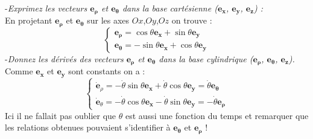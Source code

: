 \documentclass[a4paper,10pt,twoside]{article}
\begin{document}
\noindent -\textit{Exprimez les  vecteurs $\mathbf{ e_\rho}$ et  $\mathbf{ e_\theta}$ dans la base cartésienne ($\mathbf{ e_x}$, $\mathbf{ e_y}$, $\mathbf{ e_z}$) : } \\
En projetant $\mathbf{ e_\rho}$ et $\mathbf{ e_\theta}$ sur les axes $Ox$,$Oy$,$Oz$ on trouve : 
\begin{equation*}
\begin{cases}
     \mathbf{ e_\rho} = \cos{\theta}\mathbf{ e_x} + \sin{\theta}\mathbf{ e_y} \\
     \mathbf{ e_\theta} = -\sin{\theta}\mathbf{ e_x} + \cos{\theta}\mathbf{ e_y}
     \end{cases}
\end{equation*}
\noindent -\textit{Donnez les dérivés des vecteurs $\mathbf{ e_\rho}$ et  $\mathbf{ e_\theta}$ dans la base cylindrique ($\mathbf{ e_\rho}$, $\mathbf{ e_\theta}$, $ \mathbf{e_z}$).} 
\\
Comme $\mathbf{e_x}$ et $\mathbf{e_y}$ sont constants on a :
\begin{equation*}
\begin{cases}
     \mathbf{\dot e}_\rho= -\dot \theta \sin{\theta}\mathbf{ e_x} + \dot \theta \cos{\theta}\mathbf{ e_y} = \dot \theta \mathbf{ e_\theta} \\
     \mathbf{\dot e}_\theta = -\dot \theta\cos{\theta}\mathbf{ e_x}  -\dot\theta\sin{\theta}\mathbf{ e_y} = -\dot\theta\mathbf{ e_\rho}
\end{cases}    
\end{equation*}
Ici il ne fallait pas oublier que $\theta$ est aussi une fonction du temps et remarquer que les relations obtenues pouvaient s'identifier à $\mathbf{ e_\theta}$ et $\mathbf{ e_\rho}$ !\\
\end{document}
